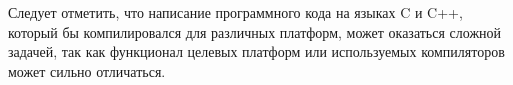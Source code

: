 Следует отметить, что написание программного кода на языках C и C++, который бы компилировался для различных платформ, может оказаться сложной задачей, так как функционал целевых платформ или используемых компиляторов может сильно отличаться.




